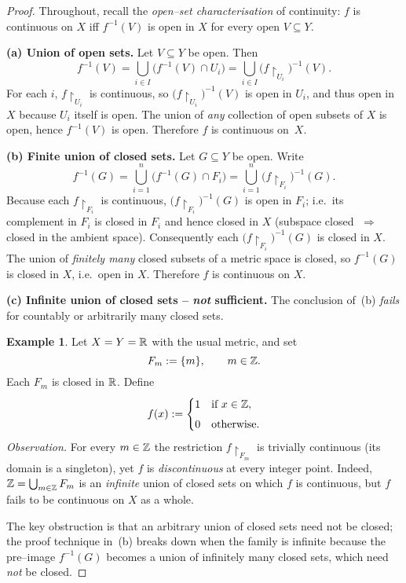 \documentclass[12pt]{article}
\theoremstyle{definition} %
\newtheorem{example}{Example}
\theoremstyle{plain} %
\begin{document}
\begin{proof}
  Throughout, recall the \emph{open–set characterisation} of continuity:
  $f$ is continuous on $X$ iff $f^{-1}(V)$ is open in $X$ for every open
  $V\subseteq Y$.

  \medskip
  \noindent\textbf{(a)  Union of open sets.}
  Let $V\subseteq Y$ be open.  Then
  \[
      f^{-1}(V)
      =\bigcup_{i\in I}\!\bigl(f^{-1}(V)\cap U_i\bigr)
      =\bigcup_{i\in I}\!\bigl(f\!\restriction_{U_i}\bigr)^{-1}(V).
  \]
  For each $i$, $f\!\restriction_{U_i}$ is continuous, so
  $\bigl(f\!\restriction_{U_i}\bigr)^{-1}(V)$ is open in $U_i$, and thus
  open in $X$ because $U_i$ itself is open.
  The union of \emph{any} collection of open subsets of $X$ is open, hence
  $f^{-1}(V)$ is open.  Therefore $f$ is continuous on~$X$.

  \medskip
  \noindent\textbf{(b)  Finite union of closed sets.}
  Let $G\subseteq Y$ be open.  Write
  \[
      f^{-1}(G)
      =\bigcup_{i=1}^{n}\!\bigl(f^{-1}(G)\cap F_i\bigr)
      =\bigcup_{i=1}^{n}\!\bigl(f\!\restriction_{F_i}\bigr)^{-1}(G).
  \]
  Because each $f\!\restriction_{F_i}$ is continuous,
  $\bigl(f\!\restriction_{F_i}\bigr)^{-1}(G)$ is open in $F_i$; i.e.\ its
  complement in $F_i$ is closed in $F_i$ and hence closed in $X$ (subspace
  closed $\;\Rightarrow\;$ closed in the ambient space).
  Consequently each \(
      \bigl(f\!\restriction_{F_i}\bigr)^{-1}(G)
  \) is closed in $X$.
  The union of \emph{finitely many} closed subsets of a metric
  space is closed, so $f^{-1}(G)$ is closed in $X$, i.e.\ open in $X$.
  Therefore $f$ is continuous on $X$.

  \medskip
  \noindent\textbf{(c)  Infinite union of closed sets – \emph{not} sufficient.}
  The conclusion of~(b) \emph{fails} for countably or arbitrarily many
  closed sets.

  \begin{example}
      Let $X=Y=\Bbb R$ with the usual metric, and set
      \[
          F_m:=\{m\},\qquad m\in\Bbb Z.
      \]
      Each $F_m$ is closed in $\Bbb R$.  
      Define
      \[
          f(x):=
          \begin{cases}
              1 & \text{if }x\in\Bbb Z,\\[4pt]
              0 & \text{otherwise.}
          \end{cases}
      \]
      \emph{Observation.}  
      For every $m\in\Bbb Z$ the restriction $f\!\restriction_{F_m}$ is
      trivially continuous (its domain is a singleton), yet $f$ is
      \emph{discontinuous} at every integer point.  Indeed,
      $\Bbb Z=\bigcup_{m\in\Bbb Z}F_m$ is an \emph{infinite} union of
      closed sets on which $f$ is continuous, but $f$ fails to be
      continuous on $X$ as a whole.
  \end{example}

  The key obstruction is that an arbitrary union of closed
  sets need not be closed; the proof technique in~(b) breaks down when
  the family is infinite because the pre–image $f^{-1}(G)$ becomes a union
  of infinitely many closed sets, which need \emph{not} be closed.
\end{proof}
\end{document}
